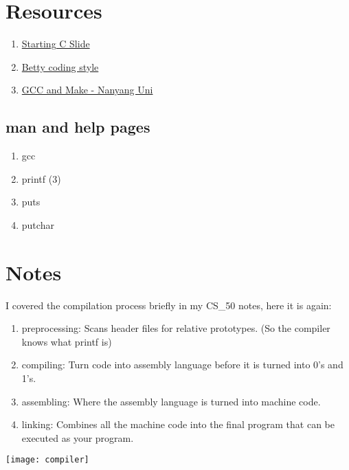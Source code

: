 \documentclass[12pt, letterpaper]{report}
\begin{document}
\section{Resources}
\begin{enumerate}
		\item \href{https://s3.amazonaws.com/alx-intranet.hbtn.io/uploads/misc/2022/4/e0ccf91eec6b977a9e00ed384dc285df9c2772e3.pdf?X-Amz-Algorithm=AWS4-HMAC-SHA256&X-Amz-Credential=AKIARDDGGGOUSBVO6H7D%2F20230518%2Fus-east-1%2Fs3%2Faws4_request&X-Amz-Date=20230518T041526Z&X-Amz-Expires=86400&X-Amz-SignedHeaders=host&X-Amz-Signature=7eb42690c07f5fd2a2f47498b2ff13ab2a10e884d1d6da328344d0a27c120201}{Starting C Slide}
		\item \href{https://github.com/holbertonschool/Betty/wiki}{Betty coding style}
		\item \href{https://www3.ntu.edu.sg/home/ehchua/programming/cpp/gcc_make.html}{GCC and Make - Nanyang Uni}
\end{enumerate}

\subsection{man and help pages}
\begin{enumerate}
	\item gcc
	\item printf (3)
	\item puts
	\item putchar
\end{enumerate}

\section{Notes}
I covered the compilation process briefly in my CS\_50 notes, here it is again:
\begin{enumerate}
	\item preprocessing: Scans header files for relative prototypes. (So the 
		compiler knows what printf is)
	\item compiling: Turn code into assembly language before it is turned into 
		0's and 1's.
	\item assembling: Where the assembly language is turned into machine code.
	\item linking: Combines all the machine code into the final program that 
		can be executed as your program.
\end{enumerate}

\begin{center}
	\texttt{[image: compiler]}
\end{center}
\end{document}
